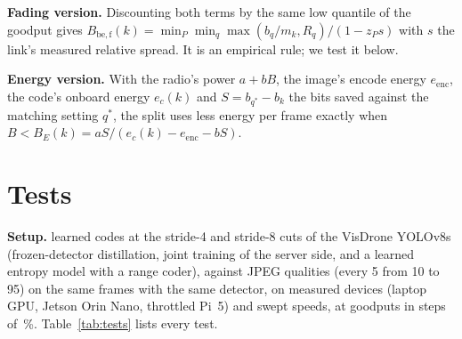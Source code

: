 \documentclass[conference,10pt]{IEEEtran}
\begin{document}
\textbf{Fading version.} Discounting both terms by the same low quantile of the goodput gives
$B_{\mathrm{be,f}}(k) = \min_P \min_{q} \max(b_q/m_k, R_q)/(1 - z_P s)$ with $s$ the link's measured relative spread. It
is an empirical rule; we test it below.

\textbf{Energy version.} With the radio's power $a + bB$, the image's encode energy $e_{\mathrm{enc}}$, the code's
onboard energy $e_c(k)$ and $S = b_{q^\ast} - b_k$ the bits saved against the matching setting $q^\ast$, the split uses
less energy per frame exactly when $B < B_E(k) = aS/(e_c(k) - e_{\mathrm{enc}} - bS)$.

\section{Tests}\label{sec:tests}
\textbf{Setup.} \BeCodes{} learned codes at the stride-4 and stride-8 cuts of the VisDrone YOLOv8s (frozen-detector
distillation, joint training of the server side, and a learned entropy model with a range coder), against
\BeJpegQualities{} JPEG qualities (every 5 from 10 to 95) on the same frames with the same detector, on
\BeMeasuredDevices{} measured devices (laptop GPU, Jetson Orin Nano, throttled Pi~5) and \BeSweepSpeeds{} swept speeds,
at goodputs in steps of \BeGridStepPct\,\%. Table~\ref{tab:tests} lists every test.
\end{document}
